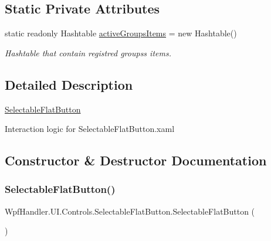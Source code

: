 \subsection*{Static Private Attributes}
\begin{DoxyCompactItemize}
\item 
static readonly Hashtable \mbox{\hyperlink{class_wpf_handler_1_1_u_i_1_1_controls_1_1_selectable_flat_button_aeda1be5761f1a96fbd14138aab118826}{active\+Groups\+Items}} = new Hashtable()
\begin{DoxyCompactList}\small\item\em Hashtable that contain registred groups\textquotesingle{}s items. \end{DoxyCompactList}\end{DoxyCompactItemize}


\subsection{Detailed Description}
\mbox{\hyperlink{class_wpf_handler_1_1_u_i_1_1_controls_1_1_selectable_flat_button}{Selectable\+Flat\+Button}} 

Interaction logic for Selectable\+Flat\+Button.\+xaml 

\subsection{Constructor \& Destructor Documentation}
\mbox{\label{class_wpf_handler_1_1_u_i_1_1_controls_1_1_selectable_flat_button_a05bd4f4c7754212984b77499922a275d}} 
\subsubsection{\texorpdfstring{Selectable\+Flat\+Button()}{SelectableFlatButton()}}
{\footnotesize\ttfamily Wpf\+Handler.\+U\+I.\+Controls.\+Selectable\+Flat\+Button.\+Selectable\+Flat\+Button (\begin{DoxyParamCaption}{ }\end{DoxyParamCaption})}



